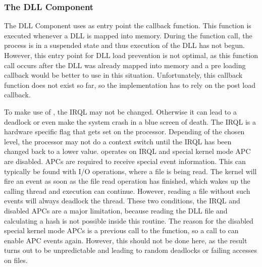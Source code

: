 \subsubsection{The DLL Component}
The \gls{DLL} Component uses as entry point the  callback function. This function is executed whenever a \gls{DLL} is mapped into memory. During the function call, the process is in a suspended state and thus execution of the \gls{DLL} has not begun. However, this entry point for \gls{DLL} load prevention is not optimal, as this function call occurs after the \gls{DLL} was already mapped into memory and a pre loading callback would be better to use in this situation. Unfortunately, this callback function does not exist so far, so the implementation has to rely on the post load callback.

\medskip

To make use of , the \gls{IRQL} may not be changed. Otherwise it can lead to a deadlock or even make the system crash in a blue screen of death. The \gls{IRQL} is a hardware specific flag that gets set on the processor. Depending of the chosen level, the processor may not do a context switch until the \gls{IRQL} has been changed back to a lower value.  operates on \gls{IRQL}  and special kernel mode \gls{APC} are disabled. \glspl{APC} are required to receive special event information. This can typically be found with I/O operations, where a file is being read. The kernel will fire an event as soon as the file read operation has finished, which wakes up the calling thread and execution can continue. However, reading a file without such events will always deadlock the thread. These two conditions, the \gls{IRQL} and disabled \glspl{APC} are a major limitation, because reading the \gls{DLL} file and calculating a hash is not possible inside this routine. The reason for the disabled special kernel mode \glspl{APC} is a previous call to the  function, so a call to  can enable \gls{APC} events again. However, this should not be done here, as the result turns out to be unpredictable and leading to random deadlocks or failing accesses on files.

\medskip

